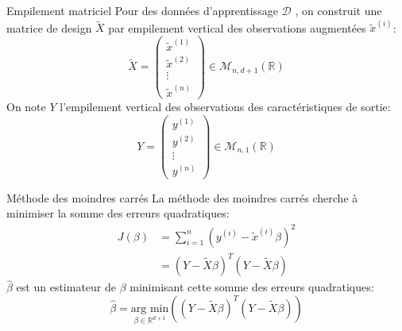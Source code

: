 \begin{frame}{Empilement matriciel}
	Pour des données d'apprentissage $\mathcal{D}$ , on construit une matrice de design $\tilde{X}$ par empilement vertical des observations augmentées $\tilde{x}^{(i)}$:
	\begin{equation}
		\tilde{X} = \begin{pmatrix}\tilde{x}^{(1)} \\ \tilde{x}^{(2)} \\ \vdots \\ \tilde{x}^{(n)} \end{pmatrix} \in \mathcal{M}_{n, d+1}(\mathbb{R})
		\nonumber
	\end{equation}
	On note $Y$ l'empilement vertical des observations des caractéristiques de sortie:
	\begin{equation}
		Y = \begin{pmatrix}y^{(1)} \\ y^{(2)} \\ \vdots \\ y^{(n)} \end{pmatrix} \in \mathcal{M}_{n, 1}(\mathbb{R})
		\nonumber
	\end{equation}	
\end{frame}

\begin{frame}{Méthode des moindres carrés}
	La méthode des moindres carrés cherche à minimiser la somme des erreurs quadratiques:
	\begin{equation}
		\begin{aligned}
			J(\beta) &= \sum_{i=1}^n \left(y^{(i)} - \tilde{x}^{(i)} \beta\right)^2 \\
			&= \left(Y - \tilde{X} \beta\right)^T \left(Y - \tilde{X} \beta\right)
		\end{aligned}
		\nonumber
	\end{equation}
	$\hat{\beta}$ est un estimateur de $\beta$ minimisant cette somme des erreurs quadratiques:
	\begin{equation}
		\hat{\beta} = \underset{\beta \in \mathbb{R}^{d+1}}{\text{arg min}}\left(\left(Y - \tilde{X} \beta\right)^T \left(Y - \tilde{X} \beta\right)\right)
		\nonumber
	\end{equation}
\end{frame}

